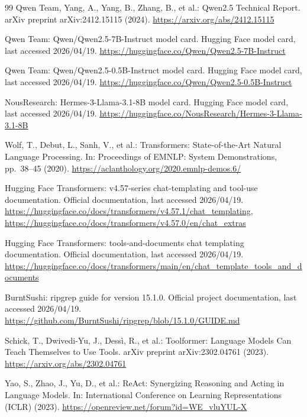 \documentclass[runningheads]{llncs}
\begin{document}
\begin{thebibliography}{99}
Qwen Team, Yang, A., Yang, B., Zhang, B., et al.: Qwen2.5 Technical Report. arXiv preprint arXiv:2412.15115 (2024). \url{https://arxiv.org/abs/2412.15115}

Qwen Team: Qwen/Qwen2.5-7B-Instruct model card. Hugging Face model card, last accessed 2026/04/19. \url{https://huggingface.co/Qwen/Qwen2.5-7B-Instruct}

Qwen Team: Qwen/Qwen2.5-0.5B-Instruct model card. Hugging Face model card, last accessed 2026/04/19. \url{https://huggingface.co/Qwen/Qwen2.5-0.5B-Instruct}

NousResearch: Hermes-3-Llama-3.1-8B model card. Hugging Face model card, last accessed 2026/04/19. \url{https://huggingface.co/NousResearch/Hermes-3-Llama-3.1-8B}

Wolf, T., Debut, L., Sanh, V., et al.: Transformers: State-of-the-Art Natural Language Processing. In: Proceedings of EMNLP: System Demonstrations, pp.~38--45 (2020). \url{https://aclanthology.org/2020.emnlp-demos.6/}

Hugging Face Transformers: v4.57-series chat-templating and tool-use documentation. Official documentation, last accessed 2026/04/19. \url{https://huggingface.co/docs/transformers/v4.57.1/chat_templating}, \url{https://huggingface.co/docs/transformers/v4.57.0/en/chat_extras}

Hugging Face Transformers: tools-and-documents chat templating documentation. Official documentation, last accessed 2026/04/19. \url{https://huggingface.co/docs/transformers/main/en/chat_template_tools_and_documents}

BurntSushi: ripgrep guide for version 15.1.0. Official project documentation, last accessed 2026/04/19. \url{https://github.com/BurntSushi/ripgrep/blob/15.1.0/GUIDE.md}

Schick, T., Dwivedi-Yu, J., Dess\`i, R., et al.: Toolformer: Language Models Can Teach Themselves to Use Tools. arXiv preprint arXiv:2302.04761 (2023). \url{https://arxiv.org/abs/2302.04761}

Yao, S., Zhao, J., Yu, D., et al.: ReAct: Synergizing Reasoning and Acting in Language Models. In: International Conference on Learning Representations (ICLR) (2023). \url{https://openreview.net/forum?id=WE_vluYUL-X}


\end{thebibliography}
\end{document}
